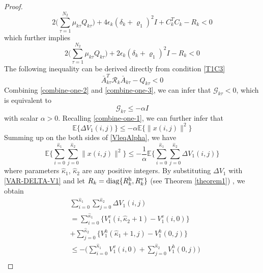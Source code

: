 \documentclass[journal,final,twocolumn]{IEEEtran}
\begin{document}
\begin{proof}
	\begin{equation}
	2\big(\sum_{\tau =1}^{N_{2}}\mu_{k\tau }Q_{k\tau }\big)+4\epsilon_{k}(\delta_{k}+\varrho_{1})^{2}I+C^{T}_{k}C_{k}-R_{k} < 0
	\end{equation}
	which further implies
	\begin{equation}\label{combine-one-2}
			2\big(\sum_{\tau =1}^{N_{2}}\mu_{k\tau }Q_{k\tau }\big)+2\epsilon_{k}(\delta_{k}+\varrho_{1})^{2}I-R_{k} < 0
	\end{equation}
	The following inequality can be  derived directly from condition \eqref{T1C3} 
	\begin{equation}\label{combine-one-3}
		\bar{A}^{T}_{k\tau }\mathcal{R}_{k}\bar{A}_{k\tau }-Q_{k\tau } < 0
	\end{equation}
	Combining \eqref{combine-one-2} and \eqref{combine-one-3}, we can infer that $\mathcal{G}_{k\tau }<0$, which is equivalent to 
	\begin{equation}
		\mathcal{G}_{k\tau } \leq -\alpha I
	\end{equation}
	with scalar $\alpha>0$.
	Recalling \eqref{combine-one-1}, we can further infer that
	\begin{equation}\label{VleqAlpha}
		\mathbb{E}\{\varDelta V_{1}(i,j) \} \leq-\alpha \mathbb{E}\{\|x(i,j)\|^{2} \}
	\end{equation}
	Summing up on the both sides of \eqref{VleqAlpha}, we have
	\begin{equation} \label{levE}
		\mathbb{E}\Big\{\sum_{i=0}^{\hat{\kappa}_{1}}\sum_{j=0}^{\hat{\kappa}_{2}}  \|x(i,j)\|^{2} \Big\} \leq -\frac{1}{\alpha} \mathbb{E}\Big\{\sum_{i=0}^{\hat{\kappa}_{1}}\sum_{j=0}^{\hat{\kappa}_{2}}  \varDelta V_{1}(i,j)  \Big\}
	\end{equation}
	where parameters $\hat{\kappa}_{1}$, $\hat{\kappa}_{2}$ are any positive integers. By substituting $\varDelta V_{1}$ with \eqref{VAR-DELTA-V1} and let $R_{k}=\mathrm{diag}\{R^{\rm{h}}_{k},R^{\rm{v}}_{k}\}$ (see Theorem \ref{theorem1}) , we obtain
	\begin{equation} \label{Vhv}
		\begin{split}
			&\sum_{i=0}^{\hat{\kappa}_{1}}\sum_{j=0}^{\hat{\kappa}_{2}}  \varDelta V_{1}(i,j)\\&= \sum_{i=0}^{\hat{\kappa}_{1}}\big\{V^{v}_{1}(i,\hat{\kappa}_{2}+1) - V^{v}_{1}(i,0) \big\}\\
			&+  \sum_{j=0}^{\hat{\kappa}_{2}}\big\{V^{h}_{1}(\hat{\kappa}_{1}+1,j) - V^{h}_{1}(0,j) \big\}\\
			&\leq -\big( \sum_{i=0}^{\hat{\kappa}_{1}}V^{v}_{1}(i,0) + \sum_{j=0}^{\hat{\kappa}_{2}}V^{h}_{1}(0,j)\big) \\

\end{split}
\end{equation}
\end{proof}
\end{document}
